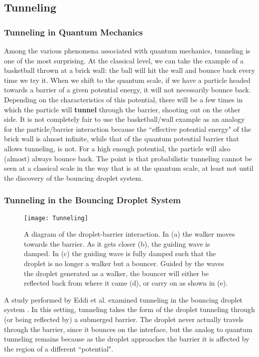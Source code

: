 \subsection{Tunneling}
\label{sect:tunneling}

    \subsubsection{Tunneling in Quantum Mechanics}
    
Among the various phenomena associated with quantum mechanics, tunneling is one of the most surprising. At the classical level, we can take the example of a basketball thrown at a brick wall: the ball will hit the wall and bounce back every time we try it. When we shift to the quantum scale, if we have a particle headed towards a barrier of a given potential energy, it will not necessarily bounce back. Depending on the characteristics of this potential, there will be a few times in which the particle will \textbf{tunnel} through the barrier, shooting out on the other side. It is not completely fair to use the basketball/wall example as an analogy for the particle/barrier interaction because the ``effective potential energy" of the brick wall is almost infinite, while that of the quantum potential barrier that allows tunneling, is not. For a high enough potential, the particle will also (almost) always bounce back. The point is that probabilistic tunneling cannot be seen at a classical scale in the way that is at the quantum scale, at least not until the discovery of the bouncing droplet system.

    \subsubsection{Tunneling in the Bouncing Droplet System}

\begin{figure}[h!]
 \centering
	    \texttt{[image: Tunneling]}
	     \caption{A diagram of the droplet-barrier interaction. In (a) the walker moves towards the barrier. As it gets closer (b), the guiding wave is damped. In (c) the guiding wave is fully damped such that the droplet is no longer a walker but a bouncer. Guided by the waves the droplet generated as a walker, the bouncer will either be reflected back from where it came (d), or carry on as shown in (e).}
	 \label{tuncartoon}
	\end{figure}
	A study performed by Eddi et al. examined tunneling in the bouncing droplet system \cite{tunneling}. In this setting, tunneling takes the form of the droplet tunneling through (or being reflected by) a submerged barrier. The droplet never actually travels through the barrier, since it bounces on the interface, but the analog to quantum tunneling remains because as the droplet approaches the barrier it is affected by the region of a different ``potential". 
	
